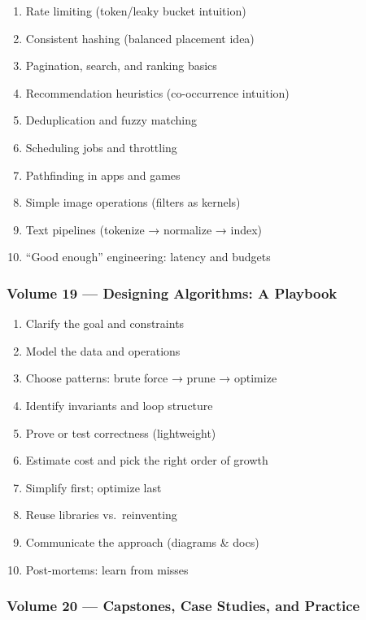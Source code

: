 \documentclass[
  letterpaper,
  DIV=11,
  numbers=noendperiod]{scrreprt}
\providecommand{\tightlist}{%
  \setlength{\itemsep}{0pt}\setlength{\parskip}{0pt}}
\begin{document}
\begin{enumerate}
\def\labelenumi{\arabic{enumi}.}
\setcounter{enumi}{170}
\tightlist
\item
  Rate limiting (token/leaky bucket intuition)
\item
  Consistent hashing (balanced placement idea)
\item
  Pagination, search, and ranking basics
\item
  Recommendation heuristics (co-occurrence intuition)
\item
  Deduplication and fuzzy matching
\item
  Scheduling jobs and throttling
\item
  Pathfinding in apps and games
\item
  Simple image operations (filters as kernels)
\item
  Text pipelines (tokenize → normalize → index)
\item
  ``Good enough'' engineering: latency and budgets
\end{enumerate}

\subsubsection{Volume 19 --- Designing Algorithms: A
Playbook}\label{volume-19-designing-algorithms-a-playbook}

\begin{enumerate}
\def\labelenumi{\arabic{enumi}.}
\setcounter{enumi}{180}
\tightlist
\item
  Clarify the goal and constraints
\item
  Model the data and operations
\item
  Choose patterns: brute force → prune → optimize
\item
  Identify invariants and loop structure
\item
  Prove or test correctness (lightweight)
\item
  Estimate cost and pick the right order of growth
\item
  Simplify first; optimize last
\item
  Reuse libraries vs.~reinventing
\item
  Communicate the approach (diagrams \& docs)
\item
  Post-mortems: learn from misses
\end{enumerate}

\subsubsection{Volume 20 --- Capstones, Case Studies, and
Practice}\label{volume-20-capstones-case-studies-and-practice}
\end{document}
